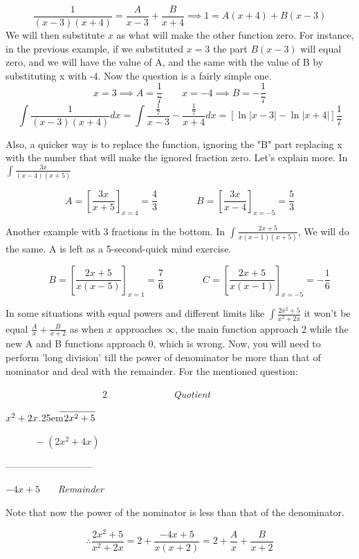 \documentclass{article}
\newcommand\longdiv[2]{%
$\strut#1$\kern.25em\smash{\raise.3ex\hbox{$\big)$}}$\mkern-8mu
        \overline{\enspace\strut#2}$}
\begin{document}
\[
	\frac{1}{(x-3)(x+4)} = \frac{A}{x-3} + \frac{B}{x+4} \implies 1=A(x+4)+B(x-3)
\]
We will then substitute $ x $ as what will make the other function zero. For instance, in the previous example, if we substituted $ x = 3 $ the part $ B(x-3) $ will equal zero, and we will have the value of A, and the same with the value of B by substituting x with -4. 
Now the question is a fairly simple one.
\[
x=3 \implies A = \frac{1}{7} \qquad x=-4 \implies B =-\frac{1}{7}
\]
\[
	 \int \frac{1}{(x-3)(x+4)} dx = \int \frac{ \frac{1}{7} }{ x-3 } - \frac{ \frac{1}{7} }{ x+4 } dx
	 =[ \ln{|x-3|} - \ln{|x+4|} ] \frac{1}{7}
\]

Also, a quicker way is to replace the function, ignoring the "B" part replacing x with the number that will make the ignored fraction zero. Let's explain more.
In $\int \frac{3x}{(x-4)(x+5)} $

\[
	A = \left [ \frac{3x}{x+5} \right ]  _{x=4}
	= \frac{4}{3} \qquad \qquad B = \left [ \frac{3x}{x-4} \right ] _{x=-5} = \frac{5}{3}
\]

Another example with 3 fractions in the bottom. In $\int \frac{ 2x+5 }{ x(x-1)(x+5) }$, We will do the same. A is left as a 5-second-quick mind exercise.

\[
	\qquad B = \left [ \frac{ 2x+5 }{ x(x-5) }    \right ]_{x=1} = \frac{7}{6} \qquad \qquad C = \left [ \frac{ 2x+5 }{ x(x-1) }   \right ]_{x=-5} = -\frac{1}{6} 
\]

In some situations with equal powers and different limits like $ \int \frac{ 2x^2+5 }{ x^2+2x }  $ it won't be equal $ \frac{A}{x} + \frac{B}{x+2} $ as when $ x $ approaches $ \infty $, the main function approach 2 while the new A and B functions approach 0, which is wrong. Now, you will need to perform 'long division' till the power of denominator be more than that of nominator and deal with the remainder. For the mentioned question: 
\begin{center}

	$ \qquad \qquad \qquad \qquad  \qquad  2 $ \ \ \ \ \ \ \ \ \ \ \ \ \ \it{Quotient} \

	\longdiv{x^2+2x}{2x^2+5}

	$ \qquad  \quad -(2x^2+4x) $
	
	---------------------------

	\qquad \qquad \qquad \qquad \qquad 	$ -4x+5  $ \ \ \ \it{Remainder}

	Note that now the power of the nominator is less than that of the denominator.

\[	
	\therefore \frac{ 2x^2 + 5 }{x^2+2x} =  2 + \frac{ -4x+5 }{ x(x+2) }
	= 2 + \frac{A}{x} + \frac{ B }{ x+2 } 
\] 

\end{center}
\end{document}
